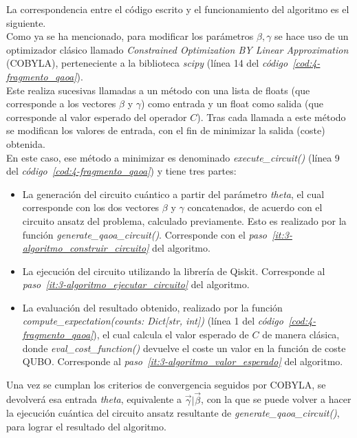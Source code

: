 La correspondencia entre el código escrito y el funcionamiento del algoritmo es el siguiente.
\\
Como ya se ha mencionado, para modificar los parámetros $\beta, \gamma$ se hace uso de un optimizador clásico llamado \textit{Constrained Optimization BY Linear Approximation} (COBYLA), perteneciente a la biblioteca \textit{scipy} (línea 14 del \textit{código~\ref{cod:4-fragmento_qaoa}}).
\\
Este realiza sucesivas llamadas a un método con una lista de floats (que corresponde a los vectores $\beta$ y $\gamma$) como entrada y un float como salida (que corresponde al valor esperado del operador $C$).
Tras cada llamada a este método se modifican los valores de entrada, con el fin de minimizar la salida (coste) obtenida.
\\
En este caso, ese método a minimizar es denominado \textit{execute\_circuit()} (línea 9 del \textit{código~\ref{cod:4-fragmento_qaoa}}) y tiene tres partes:

\begin{itemize}
\item La generación del circuito cuántico a partir del parámetro \textit{theta}, el cual corresponde con los dos vectores $\beta$ y $\gamma$ concatenados, de acuerdo con el circuito ansatz del problema, calculado previamente.
  Esto es realizado por la función \textit{generate\_qaoa\_circuit()}.
  Corresponde con el \textit{paso~\ref{it:3-algoritmo_construir_circuito}} del algoritmo.

\item La ejecución del circuito utilizando la librería de Qiskit.
    Corresponde al \textit{paso~\ref{it:3-algoritmo_ejecutar_circuito}} del algoritmo.

\item La evaluación del resultado obtenido, realizado por la función \textit{compute\_expectation(counts: Dict[str, int])} (línea 1 del \textit{código~\ref{cod:4-fragmento_qaoa}}), el cual calcula el valor esperado de $C$ de manera clásica, donde \textit{eval\_cost\_function()} devuelve el coste un valor en la función de coste QUBO\@.
  Corresponde al \textit{paso~\ref{it:3-algoritmo_valor_esperado}} del algoritmo.
\end{itemize}

Una vez se cumplan los criterios de convergencia seguidos por COBYLA, se devolverá esa entrada \textit{theta}, equivalente a $\vec{\gamma} | \vec{\beta}$, con la que se puede volver a hacer la ejecución cuántica del circuito ansatz resultante de \textit{generate\_qaoa\_circuit()}, para lograr el resultado del algoritmo.


